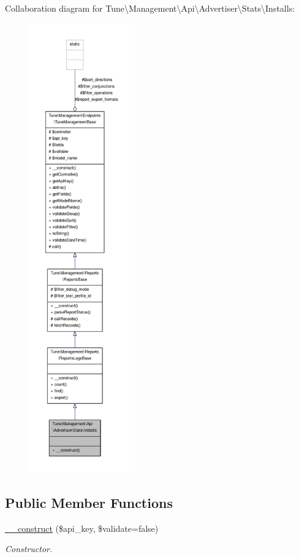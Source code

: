 Collaboration diagram for Tune\textbackslash{}Management\textbackslash{}Api\textbackslash{}Advertiser\textbackslash{}Stats\textbackslash{}Installs\-:
\nopagebreak
\begin{figure}[H]
\begin{center}
\leavevmode
\includegraphics[height=550pt]{classTune_1_1Management_1_1Api_1_1Advertiser_1_1Stats_1_1Installs__coll__graph}
\end{center}
\end{figure}
\subsection*{Public Member Functions}
\begin{DoxyCompactItemize}
\item 
\hyperlink{classTune_1_1Management_1_1Api_1_1Advertiser_1_1Stats_1_1Installs_a45676dff8a2f948220260b7348f4d508}{\-\_\-\-\_\-construct} (\$api\-\_\-key, \$validate=false)
\begin{DoxyCompactList}\small\item\em Constructor. \end{DoxyCompactList}\end{DoxyCompactItemize}
